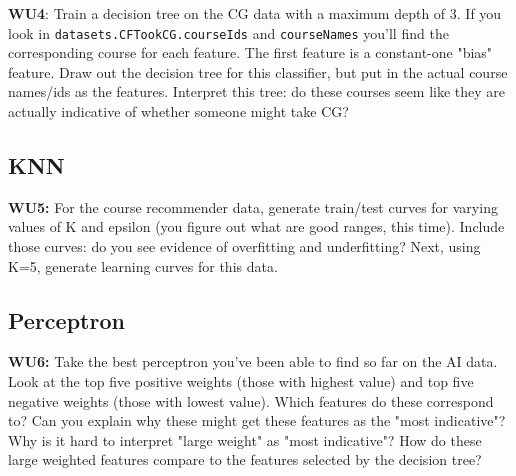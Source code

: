 \documentclass[a4paper]{article}
\begin{document}
\textbf{WU4}: Train a decision tree on the CG data with a maximum depth
of 3.  If you look in \texttt{datasets.CFTookCG.courseIds}
and \texttt{courseNames} you'll find the corresponding course for
each feature.  The first feature is a constant-one "bias" feature.
Draw out the decision tree for this classifier, but put in the actual
course names/ids as the features.  Interpret this tree: do these
courses seem like they are actually indicative of whether someone
might take CG?

\subsection{KNN}
\textbf{WU5:} For the course recommender data, generate train/test
curves for varying values of K and epsilon (you figure out what are
good ranges, this time).  Include those curves: do you see evidence of
overfitting and underfitting?  Next, using K=5, generate learning
curves for this data.


\subsection{Perceptron}
\textbf{WU6:} Take the best perceptron you've been able to find
  so far on the AI data.  Look at the top five positive weights (those
  with highest value) and top five negative weights (those with lowest
  value).  Which features do these correspond to?  Can you explain why
  these might get these features as the "most indicative"?  Why is it
  hard to interpret "large weight" as "most indicative"?  How do these
  large weighted features compare to the features selected by the
  decision tree?
\end{document}
